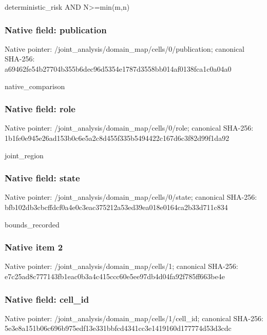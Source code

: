 \documentclass[10pt,a4paper]{article}
\begin{document}
deterministic\_risk AND N>=min(m,n)


\subsubsection{Native field: publication}


Native pointer: /joint\_analysis/domain\_m\allowbreak{}ap/cells/0/publication; canonical SHA-256: a69462fe54b27704b355b6de\allowbreak{}c96d5354e1787d3558bb014a\allowbreak{}f0138fca1c0a04a0


native\_comparison


\subsubsection{Native field: role}


Native pointer: /joint\_analysis/domain\_map/cells/0/role; canonical SHA-256: 1b1fe0e945e26ad153b0c6e5\allowbreak{}a2c8d455f335b5494422c167\allowbreak{}d6c3f82d99f1da92


joint\_region


\subsubsection{Native field: state}


Native pointer: /joint\_analysis/domain\_m\allowbreak{}ap/cells/0/state; canonical SHA-256: bfb102db3cbcffdcf0a4e0c3\allowbreak{}eac375212a53ed39ea018e01\allowbreak{}64ca2b33d711c834


bounds\_recorded


\subsubsection{Native item 2}


Native pointer: /joint\_analysis/domain\_map/cells/1; canonical SHA-256: e7c25ad8c777143fb1eac0b3\allowbreak{}a4c415ccc60e5ee97db4d04f\allowbreak{}a92f785ff663be4e



\subsubsection{Native field: cell\_id}


Native pointer: /joint\_analysis/domain\_m\allowbreak{}ap/cells/1/cell\_id; canonical SHA-256: 5e3e8a151b06c696b975edf1\allowbreak{}3e331bbfcd4341cc3e141916\allowbreak{}0d177774d53d3cdc
\end{document}

